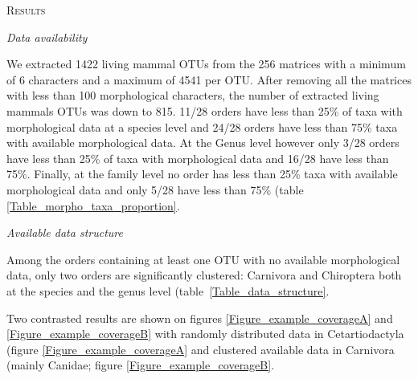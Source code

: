\documentclass[12pt,letterpaper]{article}
\renewcommand{\section}[1]{%
\bigskip
\begin{center}
\begin{Large}
\normalfont\scshape #1
\medskip
\end{Large}
\end{center}}
\renewcommand{\subsection}[1]{%
\bigskip
\begin{center}
\begin{large}
\normalfont\itshape #1
\end{large}
\end{center}}
\begin{document}
\section{Results}

\subsection{Data availability}
We extracted 1422 living mammal OTUs from the 256 matrices with a minimum of 6 characters and a maximum of 4541 per OTU.
After removing all the matrices with less than 100 morphological characters, the number of extracted living mammals OTUs was down to 815.
11/28 orders have less than 25\% of taxa with morphological data at a species level and 24/28 orders have less than 75\% taxa with available morphological data.
At the Genus level however only 3/28 orders have less than 25\% of taxa with morphological data and 16/28 have less than 75\%.
Finally, at the family level no order has less than 25\% taxa with available morphological data and only 5/28 have less than 75\% (table \ref{Table_morpho_taxa_proportion}.

\renewcommand\baselinestretch{1.2}\selectfont
\begin{center}

\end{center}
\renewcommand\baselinestretch{2}\selectfont

\subsection{Available data structure}
Among the orders containing at least one OTU with no available morphological data, only two orders are significantly clustered: Carnivora and Chiroptera both at the species and the genus level (table~\ref{Table_data_structure}.

\renewcommand\baselinestretch{1.2}\selectfont
\begin{center}

\end{center}
\renewcommand\baselinestretch{2}\selectfont

Two contrasted results are shown on figures \ref{Figure_example_coverageA} and \ref{Figure_example_coverageB} with randomly distributed data in Cetartiodactyla (figure \ref{Figure_example_coverageA} and clustered available data in Carnivora (mainly Canidae; figure \ref{Figure_example_coverageB}.
\end{document}
